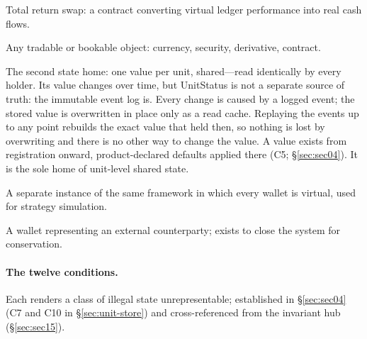\begin{description}[style=nextline]
\item[TRS] Total return swap: a contract converting virtual ledger performance into real cash flows.

\item[Unit] Any tradable or bookable object: currency, security, derivative, contract.

\item[UnitStatus] The second state home: one value per unit, shared---read identically by every holder. Its value changes over time, but UnitStatus is not a separate source of truth: the immutable event log is. Every change is caused by a logged event; the stored value is overwritten in place only as a read cache. Replaying the events up to any point rebuilds the exact value that held then, so nothing is lost by overwriting and there is no other way to change the value. A value exists from registration onward, product-declared defaults applied there (C5; \S\ref{sec:sec04}). It is the sole home of unit-level shared state.

\item[Virtual ledger] A separate instance of the same framework in which every wallet is virtual, used for strategy simulation.

\item[Virtual wallet] A wallet representing an external counterparty; exists to close the system for conservation.

\end{description}

\paragraph{The twelve conditions.}
Each renders a class of illegal state unrepresentable; established in \S\ref{sec:sec04} (C7 and C10 in \S\ref{sec:unit-store}) and cross-referenced from the invariant hub (\S\ref{sec:sec15}).

